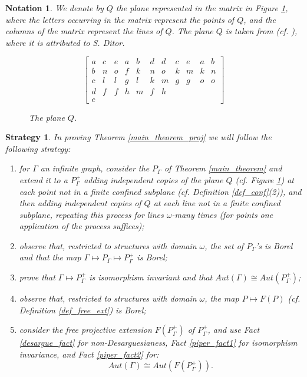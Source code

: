 \documentclass{amsart}
\newtheorem{strategy}[theorem]{Strategy}
\newtheorem{notation}[theorem]{Notation}
\numberwithin{claimcounter}{theorem}
\begin{document}
\begin{notation} We denote by $Q$ the plane represented in the matrix in Figure \ref{myfigure}, where the letters occurring in the matrix represent the points of $Q$, and the columns of the matrix represent the lines of $Q$.
The plane $Q$ is taken from \cite{projective} (cf. \cite[Diagram 1]{projective}), where it is attributed to S. Ditor.

	\begin{figure}[htb]
\begin{center}
\[ \begin{bmatrix}
    a & c & e & a & b & d & d & c & e & a & b \\
    b & n & o & f & k & n & o & k & m & k & n \\
    c & l & l & g & l & k & m & g & g & o & o \\
    d & f & f & h & m & f & h &   &   &   &   \\
    e &   &   &  &    &   &   &   &   &   &   
  \end{bmatrix}
\]
\caption{The plane $Q$.}\label{myfigure}
\end{center}
\end{figure}
\end{notation}

	\begin{strategy}\label{strategy} In proving Theorem \ref{main_theorem_proj} we will follow the following strategy:
	\begin{enumerate}[(1)]
	\item for $\Gamma$ an infinite graph, consider the $P_{\Gamma}$ of Theorem \ref{main_theorem} and extend it to a $P^+_{\Gamma}$ adding independent copies of the plane $Q$ (cf. Figure \ref{myfigure}) at each point not in a finite confined subplane (cf. Definition \ref{def_conf}(2)), and then adding independent copies of $Q$ at each line not in a finite confined subplane, repeating this process for lines $\omega$-many times (for points one application of the process suffices);
	\item observe that, restricted to structures with domain $\omega$, the set of $P_{\Gamma}$'s is Borel and that the map $\Gamma \mapsto P_{\Gamma} \mapsto P^+_{\Gamma}$ is Borel; 
	\item prove that $\Gamma \mapsto P^+_{\Gamma}$ is isomorphism invariant and that $Aut(\Gamma) \cong Aut(P^+_{\Gamma})$;
	\item observe that, restricted to structures with domain $\omega$, the map $P \mapsto F(P)$ (cf. Definition \ref{def_free_ext}) is Borel;
	\item consider the free projective extension $F(P^+_{\Gamma})$ of $P^+_{\Gamma}$, and use Fact \ref{desargue_fact} for non-Desarguesianess, Fact \ref{piper_fact1} for isomorphism invariance, and Fact \ref{piper_fact2} for:
	$$Aut(\Gamma) \cong Aut(F(P^+_{\Gamma})).$$
\end{enumerate}
\end{strategy}
\end{document}
